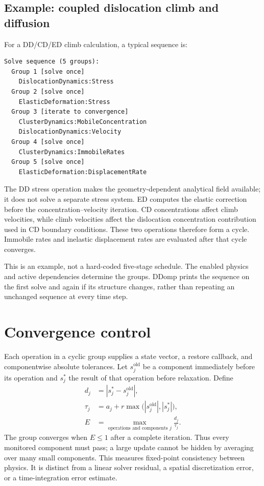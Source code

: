 \subsection{Example: coupled dislocation climb and diffusion}
For a DD/CD/ED climb calculation, a typical sequence is:
\begin{lstlisting}
Solve sequence (5 groups):
  Group 1 [solve once]
    DislocationDynamics:Stress
  Group 2 [solve once]
    ElasticDeformation:Stress
  Group 3 [iterate to convergence]
    ClusterDynamics:MobileConcentration
    DislocationDynamics:Velocity
  Group 4 [solve once]
    ClusterDynamics:ImmobileRates
  Group 5 [solve once]
    ElasticDeformation:DisplacementRate
\end{lstlisting}
The DD stress operation makes the geometry-dependent analytical field available; it does not solve a separate stress system. ED computes the elastic correction before the concentration--velocity iteration. CD concentrations affect climb velocities, while climb velocities affect the dislocation concentration contribution used in CD boundary conditions. These two operations therefore form a cycle. Immobile rates and inelastic displacement rates are evaluated after that cycle converges.

This is an example, not a hard-coded five-stage schedule. The enabled physics and active dependencies determine the groups. DDomp prints the sequence on the first solve and again if its structure changes, rather than repeating an unchanged sequence at every time step.

\section{Convergence control}\label{sec:coupledTolerance}
Each operation in a cyclic group supplies a state vector, a restore callback, and componentwise absolute tolerances. Let $s_j^{\mathrm{old}}$ be a component immediately before its operation and $s_j^*$ the result of that operation before relaxation. Define
\begin{align}
 d_j&=|s_j^*-s_j^{\mathrm{old}}|,\\
 \tau_j&=a_j+r\max\bigl(|s_j^{\mathrm{old}}|,|s_j^*|\bigr),\\
 E&=\max_{\text{operations and components }j}\frac{d_j}{\tau_j}.
\end{align}
The group converges when $E\leq1$ after a complete iteration. Thus every monitored component must pass; a large update cannot be hidden by averaging over many small components. This measures fixed-point consistency between physics. It is distinct from a linear solver residual, a spatial discretization error, or a time-integration error estimate.

